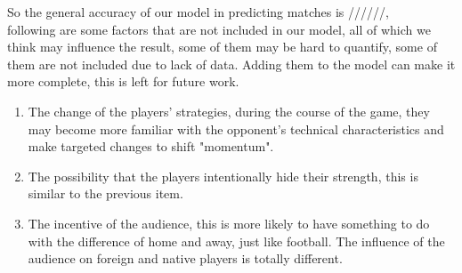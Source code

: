 \documentclass[12pt, a4paper, oneside]{article}
\theoremstyle{break}
\begin{document}
So the general accuracy of our model in predicting matches is //////, \\
following are some factors that are not included in our model, 
all of which we think may influence the result, some of them may be hard to quantify, some of them are not included due to lack
of data. Adding them to the model can make it more complete, this is left for future work.
\begin{enumerate}
    \item The change of the players' strategies, during the course of the game, they may become more 
    familiar with the opponent's technical characteristics and make targeted changes to shift "momentum".
    \item The possibility that the players intentionally hide their strength, this is similar to the previous item.
    \item The incentive of the audience, this is more likely to have something to do with the difference of home and away,
    just like football. The influence of the audience on foreign and native players is totally different.
\end{enumerate}
\end{document}
